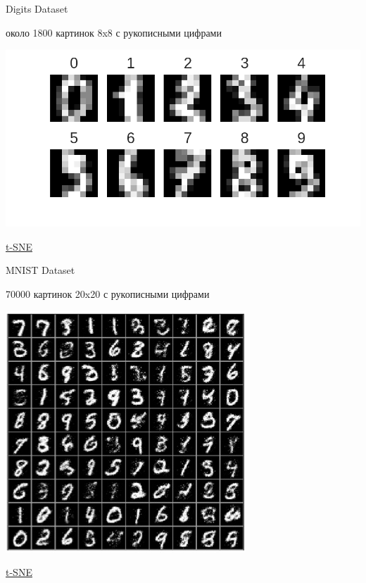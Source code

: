 \documentclass[aspectratio=169]{beamer}
\begin{document}
\begin{frame}{Digits Dataset}

около 1800 картинок 8x8 с рукописными цифрами 

\begin{center}
\includegraphics[scale=0.5]{images/digits.png}
\end{center}

\href{https://raw.githubusercontent.com/oreillymedia/t-SNE-tutorial/master/images/animation.gif}{t-SNE}

\end{frame}

\begin{frame}{MNIST Dataset}

70000 картинок 20x20 с рукописными цифрами 

\begin{center}
\includegraphics[scale=1.0]{images/mnistdigits.jpg}
\end{center}

\href{http://lvdmaaten.github.io/tsne/examples/mnist_tsne.jpg}{t-SNE}

\end{frame}
\end{document}
